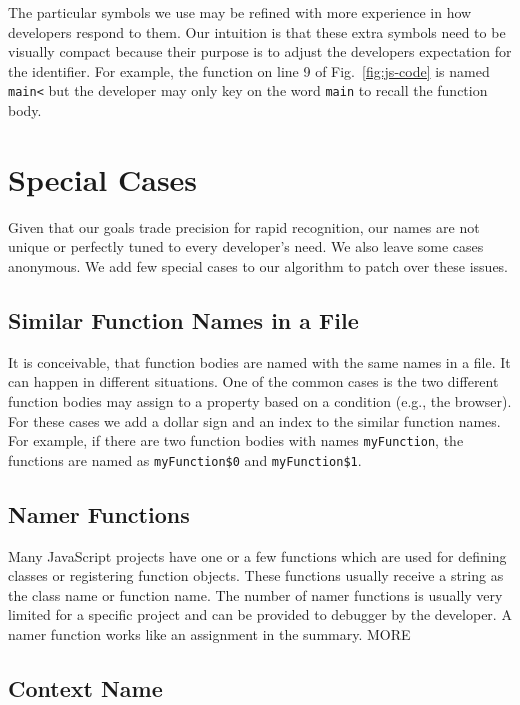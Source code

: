 \documentclass[10pt, preprint]{sigplanconf}
\begin{document}
{The particular symbols we use may be refined with more experience in how developers respond to them. Our intuition is that these extra symbols need to be visually compact because their purpose is to adjust the developers expectation for the identifier. For example, the function on line 9 of Fig.~\ref{fig:js-code} is named \texttt{main<} but the developer may only key on the word \texttt{main} to recall the function body. 

\section{Special Cases}
Given that our goals trade precision for rapid recognition, our names are not unique or perfectly tuned to every developer's need. We also leave some cases anonymous. We add  few special cases to our algorithm to patch over these issues.

\subsection{Similar Function Names in a File}
It is conceivable, that function bodies are named with the same names in a file. It can happen in different situations. One of the common cases is the two different function bodies may assign to a property based on a condition (e.g., the browser). For these cases we add a dollar sign and an index to the similar function names. For example, if there are two function bodies with names {\small\texttt{myFunction}}, the functions are named as {\small\texttt{myFunction\$0}} and {\small\texttt{myFunction\$1}}. 

\subsection{Namer Functions}
Many JavaScript projects have one or a few functions which are used for defining classes or registering function objects. These functions usually receive a string as the class name or function name. The number of namer functions is usually very limited for a specific project and can be provided to debugger by the developer. A namer function works like an assignment in the summary.  MORE




\subsection{Context Name}

}
\end{document}
